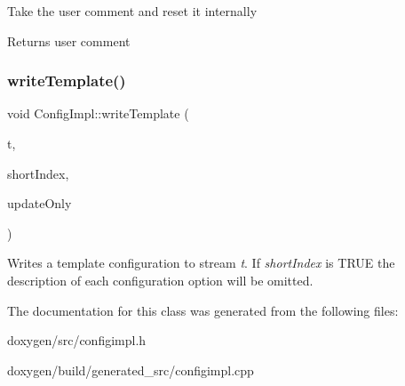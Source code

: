Take the user comment and reset it internally \begin{DoxyReturn}{Returns}
user comment 
\end{DoxyReturn}
\mbox{\label{class_config_impl_a7c5c68e28946cdb2a25bc9dca561a4c8}} 
\subsubsection{\texorpdfstring{writeTemplate()}{writeTemplate()}}
{\footnotesize\ttfamily void Config\+Impl\+::write\+Template (\begin{DoxyParamCaption}\item[{\mbox{\hyperlink{class_f_text_stream}{F\+Text\+Stream}} \&}]{t,  }\item[{bool}]{short\+Index,  }\item[{bool}]{update\+Only }\end{DoxyParamCaption})}

Writes a template configuration to stream {\itshape t}. If {\itshape short\+Index} is {\ttfamily T\+R\+UE} the description of each configuration option will be omitted. 

The documentation for this class was generated from the following files\+:\begin{DoxyCompactItemize}
\item 
doxygen/src/configimpl.\+h\item 
doxygen/build/generated\+\_\+src/configimpl.\+cpp\end{DoxyCompactItemize}
